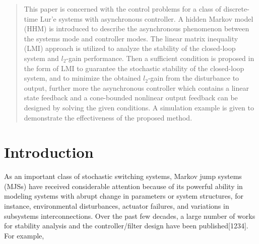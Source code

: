 \documentclass[conference]{IEEEtran}
\begin{document}




\maketitle

\begin{abstract}
	This paper is concerned with the control problems for a class of discrete-time Lur'e systems with asynchronous controller. A hidden Markov model (HHM) is introduced to describe the asynchronous phenomenon between the systems mode and controller modes. The linear matrix inequality (LMI) approach is utilized to analyze the stability of the closed-loop system and $l_2$-gain performance.  Then a sufficient condition is proposed in the form of LMI to guarantee the stochastic stability of the closed-loop system, and to minimize the obtained $l_2$-gain from the disturbance to output, further more the asynchronous controller which contains a linear state feedback and a cone-bounded nonlinear output feedback can be designed by solving the given conditions. A simulation example is given to demonstrate the effectiveness of the proposed method. 
\end{abstract}





%
\IEEEpeerreviewmaketitle
  
   

\section{Introduction}
	As an important class of stochastic switching systems, Markov jump systems (MJSs) have received considerable attention because of its powerful ability in modeling systems with abrupt change in parameters or system structures, for instance,  environmental disturbances, actuator failures, and variations in subsystems interconnections. Over the past few decades, a large number of works for stability analysis and the controller/filter design have been published[1234]. For example,    
	
\end{document}
